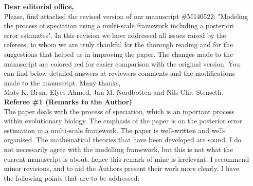 \documentclass[a4paper,11pt]{scrartcl}
\date{}%
\begin{document}
\textbf{Dear editorial office,}\\

Please, find attached the revised version of our manuscript \#M140522: "Modeling the process of speciation using a multi-scale framework including a posteriori error estimates". In this revision we have addressed all issues raised by the referees, to whom we are truly thankful for the thorough reading and for the suggestions that helped us in improving the paper. The changes made to the manuscript are colored red for easier comparison with the original version. You can find below detailed answers at reviewers comments and the modifications made to the manuscript. Many thanks,\\

Mats K. Brun, Elyes Ahmed, Jan M. Nordbotten and Nils Chr. Stenseth.\\[2ex]

\textbf{ Referee \#1  (Remarks to the Author)}\\

The paper deals with the process of speciation, which is an inportant process within evolutionary biology. The emphasis of the paper is on the posterior error estimation in a multi-scale framework. The paper is well-written and well-organised. The mathematical theories that have been developed are sound. I do not necessarily agree with the modelling framework, but this is not what the current manuscript is about, hence this remark of mine is irrelevant. I recommend minor revisions, and to aid the Authors present their work more clearly, I have the following points that are to be addressed:
\end{document}

